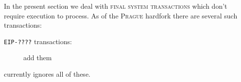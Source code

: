 In the present section we deal with \textsc{final system transactions} which don't require \evm{} execution to process.
As of the \textsc{Prague} hardfork there are several such transactions:
\begin{description}
	\item[\texttt{EIP-????} transactions:]
		\specTodo{} add them
\end{description}
\saNote{}
\linea{} currently ignores all of these.
